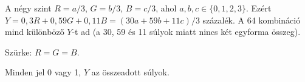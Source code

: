 A négy szint $R=a/3$, $G=b/3$, $B=c/3$, ahol $a,b,c\in\{0,1,2,3\}$. Ezért $Y=0{,}3R+0{,}59G+0{,}11B=(30a+59b+11c)/3$ százalék. A 64 kombináció mind különböző $Y$-t ad (a 30, 59 és 11 súlyok miatt nincs két egyforma összeg).

\begin{center}\end{center}

Szürke: $R=G=B$.

\begin{center}\end{center}

Minden jel 0 vagy 1, $Y$ az összeadott súlyok.

\begin{center}\end{center}
\begin{eredmeny}

\begin{center}\end{center}
\end{eredmeny}


